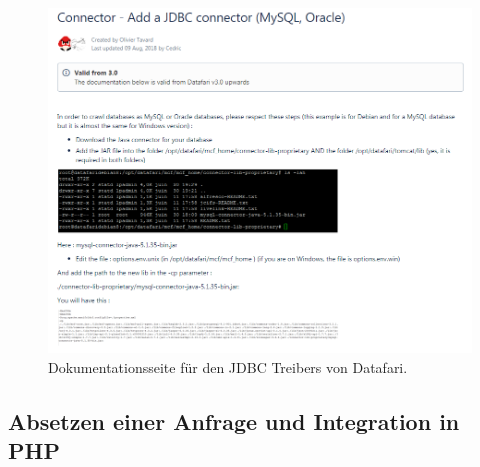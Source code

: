 \begin{figure}
	\centering
	\includegraphics[width=1\linewidth]{images/datafari_doku_wrong_path.png}
	\caption{Dokumentationsseite für den JDBC Treibers von Datafari.}
	\label{img:datafariJDBC}
\end{figure}


\subsection{Absetzen einer Anfrage und Integration in PHP}

